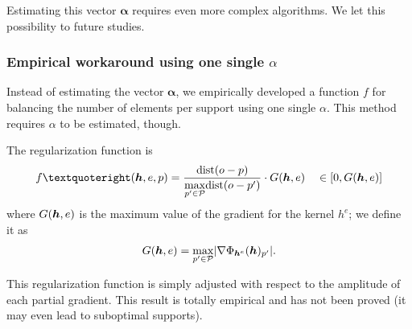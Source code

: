 \noindent
Estimating this vector $\bm{\alpha}$ requires even more complex algorithms. We let this possibility to future studies.

\subsubsection{Empirical workaround using one single $\alpha$}
Instead of estimating the vector $\bm{\alpha}$, we empirically developed a function $f$ for balancing the number of elements per support using one single $\alpha$. This method requires $\alpha$ to be estimated, though.

\noindent
The regularization function is
\begin{equation}
f’(\h,e,p) = \frac{\text{dist}(o-p)}{\underset{p' \in \P}{\max}\text{dist}(o-p')} \cdot G(\h,e) \quad \in [0,G(\h,e)]\label{eq_regularized1}
\end{equation}
where $G(\bm{h},e)$ is the maximum value of the gradient for the kernel $h^e$; we define it as 
\begin{equation*} 
G(\bm{h},e)=\underset{p' \in \mathcal P}{\max} |\nabla \Phi_{\bm{h}^e}(\bm{h})_{p'}|.
\end{equation*}

\noindent
This regularization function is simply adjusted with respect to the amplitude of each partial gradient. This result is totally empirical and has not been proved (it may even lead to suboptimal supports).


